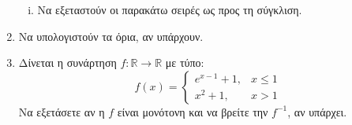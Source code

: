 \begin{enumerate}
\begin{enumerate}[i)]
            \item Να εξεταστούν οι παρακάτω σειρές ως προς τη σύγκλιση.
        \end{enumerate}

    \item Να υπολογιστούν τα όρια, αν υπάρχουν.


    \item Δίνεται η συνάρτηση $ f \colon \mathbb{R} \to \mathbb{R} $ με τύπο:
        \[
            f(x) = 
            \begin{cases} 
                e^{x-1}+1, & x \leq 1 \\ 
                x^{2}+1, & x >1 
            \end{cases}  
        \] 
        Να εξετάσετε αν η $f$ είναι μονότονη και να βρείτε την $ f^{-1} $, αν 
        υπάρχει.
\end{enumerate}




